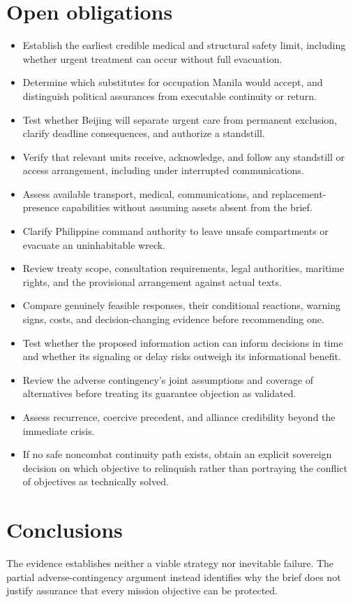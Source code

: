 \documentclass[11pt]{article}
\begin{document}
\section{Open obligations}
\begin{itemize}
\item Establish the earliest credible medical and structural safety limit, including whether urgent treatment can occur without full evacuation.
\item Determine which substitutes for occupation Manila would accept, and distinguish political assurances from executable continuity or return.
\item Test whether Beijing will separate urgent care from permanent exclusion, clarify deadline consequences, and authorize a standstill.
\item Verify that relevant units receive, acknowledge, and follow any standstill or access arrangement, including under interrupted communications.
\item Assess available transport, medical, communications, and replacement-presence capabilities without assuming assets absent from the brief.
\item Clarify Philippine command authority to leave unsafe compartments or evacuate an uninhabitable wreck.
\item Review treaty scope, consultation requirements, legal authorities, maritime rights, and the provisional arrangement against actual texts.
\item Compare genuinely feasible responses, their conditional reactions, warning signs, costs, and decision-changing evidence before recommending one.
\item Test whether the proposed information action can inform decisions in time and whether its signaling or delay risks outweigh its informational benefit.
\item Review the adverse contingency's joint assumptions and coverage of alternatives before treating its guarantee objection as validated.
\item Assess recurrence, coercive precedent, and alliance credibility beyond the immediate crisis.
\item If no safe noncombat continuity path exists, obtain an explicit sovereign decision on which objective to relinquish rather than portraying the conflict of objectives as technically solved.
\end{itemize}
\section{Conclusions}
The evidence establishes neither a viable strategy nor inevitable failure. The partial adverse-contingency argument instead identifies why the brief does not justify assurance that every mission objective can be protected.
\end{document}
